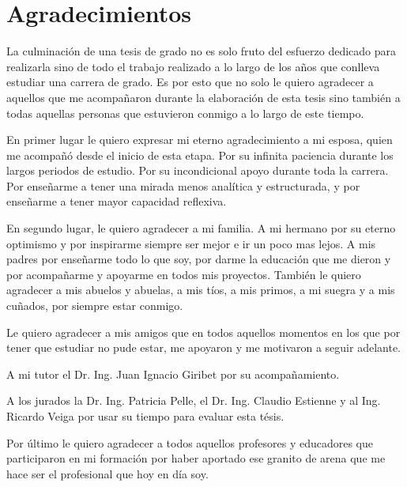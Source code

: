 \section*{\hfil Agradecimientos \hfil}

\noindent La culminación de una tesis de grado no es solo fruto del esfuerzo dedicado para realizarla sino de todo el trabajo realizado a lo largo de los años que conlleva estudiar una carrera de grado. Es por esto que no solo le quiero agradecer a aquellos que me acompañaron durante la elaboración de esta tesis sino también a todas aquellas personas que estuvieron conmigo a lo largo de este tiempo.

\noindent En primer lugar le quiero expresar mi eterno agradecimiento a mi esposa, quien me acompañó desde el inicio de esta etapa. Por su infinita paciencia durante los largos periodos de estudio. Por su incondicional apoyo durante toda la carrera. Por enseñarme a tener una mirada menos analítica y estructurada, y por enseñarme a tener mayor capacidad reflexiva.

\noindent En segundo lugar, le quiero agradecer a mi familia. A mi hermano por su eterno optimismo y por inspirarme siempre ser mejor e ir un poco mas lejos. A mis padres por enseñarme todo lo que soy, por darme la educación que me dieron y por acompañarme y apoyarme en todos mis proyectos. También le quiero agradecer a mis abuelos y abuelas, a mis tíos, a mis primos, a mi suegra y a mis cuñados, por siempre estar conmigo.

\noindent Le quiero agradecer a mis amigos que en todos aquellos momentos en los que por tener que estudiar no pude estar, me apoyaron y me motivaron a seguir adelante.

\noindent A mi tutor el Dr. Ing. Juan Ignacio Giribet por su acompañamiento.

\noindent A los jurados la Dr. Ing. Patricia Pelle, el Dr. Ing. Claudio Estienne y al Ing. Ricardo Veiga por usar su tiempo para evaluar esta tésis.

\noindent Por último le quiero agradecer a todos aquellos profesores y educadores que participaron en mi formación por haber aportado ese granito de arena que me hace ser el profesional que hoy en día soy.